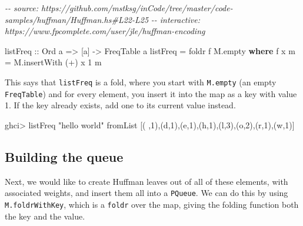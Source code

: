 \documentclass[]{article}
\newenvironment{Shaded}{}{}
\newcommand{\CharTok}[1]{\textcolor[rgb]{0.25,0.44,0.63}{#1}}
\newcommand{\CommentTok}[1]{\textcolor[rgb]{0.38,0.63,0.69}{\textit{#1}}}
\newcommand{\DataTypeTok}[1]{\textcolor[rgb]{0.56,0.13,0.00}{#1}}
\newcommand{\DecValTok}[1]{\textcolor[rgb]{0.25,0.63,0.44}{#1}}
\newcommand{\FunctionTok}[1]{\textcolor[rgb]{0.02,0.16,0.49}{#1}}
\newcommand{\KeywordTok}[1]{\textcolor[rgb]{0.00,0.44,0.13}{\textbf{#1}}}
\newcommand{\NormalTok}[1]{#1}
\newcommand{\OperatorTok}[1]{\textcolor[rgb]{0.40,0.40,0.40}{#1}}
\newcommand{\OtherTok}[1]{\textcolor[rgb]{0.00,0.44,0.13}{#1}}
\newcommand{\StringTok}[1]{\textcolor[rgb]{0.25,0.44,0.63}{#1}}
\begin{document}
\begin{Shaded}
\begin{Highlighting}[]
\CommentTok{{-}{-} source: https://github.com/mstksg/inCode/tree/master/code{-}samples/huffman/Huffman.hs\#L22{-}L25}
\CommentTok{{-}{-} interactive: https://www.fpcomplete.com/user/jle/huffman{-}encoding}

\OtherTok{listFreq ::} \DataTypeTok{Ord}\NormalTok{ a }\OtherTok{=\textgreater{}}\NormalTok{ [a] }\OtherTok{{-}\textgreater{}} \DataTypeTok{FreqTable}\NormalTok{ a}
\NormalTok{listFreq }\OtherTok{=} \FunctionTok{foldr}\NormalTok{ f M.empty}
  \KeywordTok{where}
\NormalTok{    f x m }\OtherTok{=}\NormalTok{ M.insertWith (}\OperatorTok{+}\NormalTok{) x }\DecValTok{1}\NormalTok{ m}
\end{Highlighting}
\end{Shaded}

This says that \texttt{listFreq} is a fold, where you start with
\texttt{M.empty} (an empty \texttt{FreqTable}) and for every element, you insert
it into the map as a key with value 1. If the key already exists, add one to its
current value instead.

\begin{Shaded}
\begin{Highlighting}[]
\NormalTok{ghci}\OperatorTok{\textgreater{}}\NormalTok{ listFreq }\StringTok{"hello world"}
\NormalTok{fromList [(}\CharTok{\textquotesingle{} \textquotesingle{}}\NormalTok{,}\DecValTok{1}\NormalTok{),(}\CharTok{\textquotesingle{}d\textquotesingle{}}\NormalTok{,}\DecValTok{1}\NormalTok{),(}\CharTok{\textquotesingle{}e\textquotesingle{}}\NormalTok{,}\DecValTok{1}\NormalTok{),(}\CharTok{\textquotesingle{}h\textquotesingle{}}\NormalTok{,}\DecValTok{1}\NormalTok{),(}\CharTok{\textquotesingle{}l\textquotesingle{}}\NormalTok{,}\DecValTok{3}\NormalTok{),(}\CharTok{\textquotesingle{}o\textquotesingle{}}\NormalTok{,}\DecValTok{2}\NormalTok{),(}\CharTok{\textquotesingle{}r\textquotesingle{}}\NormalTok{,}\DecValTok{1}\NormalTok{),(}\CharTok{\textquotesingle{}w\textquotesingle{}}\NormalTok{,}\DecValTok{1}\NormalTok{)]}
\end{Highlighting}
\end{Shaded}

\subsection{Building the queue}\label{building-the-queue}

Next, we would like to create Huffman leaves out of all of these elements, with
associated weights, and insert them all into a \texttt{PQueue}. We can do this
by using \texttt{M.foldrWithKey}, which is a \texttt{foldr} over the map, giving
the folding function both the key and the value.
\end{document}
